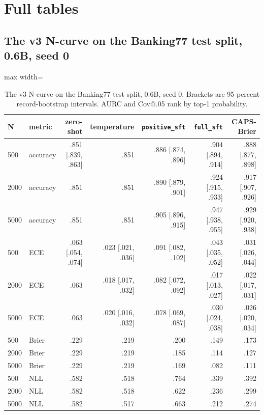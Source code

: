 \documentclass[10pt,letterpaper]{article}
\theoremstyle{plain}
\begin{document}



\clearpage
\appendix
{}
\section{Full tables}\label{sec:A}

\subsection{The v3 N-curve on the Banking77 test split, 0.6B, seed 0}\label{sec:A1}

\begin{table}[H]
\centering
\footnotesize
\setlength{\tabcolsep}{3pt}
\caption{The v3 N-curve on the Banking77 test split, 0.6B, seed 0. Brackets are 95 percent record-bootstrap intervals. AURC and Cov@.05 rank by top-1 probability.}
\label{tab:A1}
\begin{adjustbox}{max width=\textwidth}
\begin{tabular}{llrrrrr}
\toprule
N & metric & zero-shot & temperature & \texttt{positive\_sft} & \texttt{full\_sft} & CAPS-Brier \\
\midrule
500 & accuracy & .851 [.839, .863] & .851 & .886 [.874, .896] & .904 [.894, .914] & .888 [.877, .898] \\
2000 & accuracy & .851 & .851 & .890 [.879, .901] & .924 [.915, .933] & .917 [.907, .926] \\
5000 & accuracy & .851 & .851 & .905 [.896, .915] & .947 [.938, .955] & .929 [.920, .938] \\
500 & ECE & .063 [.054, .074] & .023 [.021, .036] & .091 [.082, .102] & .043 [.035, .052] & .031 [.026, .044] \\
2000 & ECE & .063 & .018 [.017, .032] & .082 [.072, .092] & .017 [.013, .027] & .022 [.017, .031] \\
5000 & ECE & .063 & .020 [.016, .032] & .078 [.069, .087] & .030 [.024, .038] & .026 [.020, .034] \\
500 & Brier & .229 & .219 & .200 & .149 & .173 \\
2000 & Brier & .229 & .219 & .185 & .114 & .127 \\
5000 & Brier & .229 & .219 & .169 & .082 & .111 \\
500 & NLL & .582 & .518 & .764 & .339 & .392 \\
2000 & NLL & .582 & .518 & .622 & .236 & .299 \\
5000 & NLL & .582 & .517 & .663 & .212 & .274 \\

\end{tabular}
\end{adjustbox}
\end{table}
\end{document}
